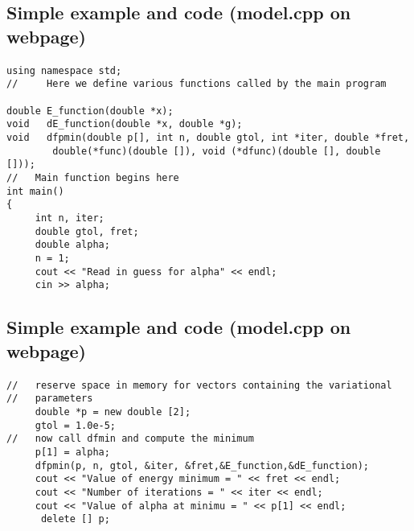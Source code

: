 \documentclass[%
twoside,                 %
final,                   %
10pt]{article}
\begin{document}
\subsection*{Simple example and code (model.cpp on webpage)}

\paragraph{}
\begin{verbatim}
using namespace std;
//     Here we define various functions called by the main program

double E_function(double *x);
void   dE_function(double *x, double *g);
void   dfpmin(double p[], int n, double gtol, int *iter, double *fret,
	    double(*func)(double []), void (*dfunc)(double [], double []));
//   Main function begins here
int main()
{
     int n, iter;
     double gtol, fret;
     double alpha;
     n = 1;
     cout << "Read in guess for alpha" << endl;
     cin >> alpha;
\end{verbatim}



\subsection*{Simple example and code (model.cpp on webpage)}

\paragraph{}
\begin{verbatim}
//   reserve space in memory for vectors containing the variational
//   parameters
     double *p = new double [2];
     gtol = 1.0e-5;
//   now call dfmin and compute the minimum
     p[1] = alpha;
     dfpmin(p, n, gtol, &iter, &fret,&E_function,&dE_function);
     cout << "Value of energy minimum = " << fret << endl;
     cout << "Number of iterations = " << iter << endl;
     cout << "Value of alpha at minimu = " << p[1] << endl;
      delete [] p;
\end{verbatim}



\end{document}
